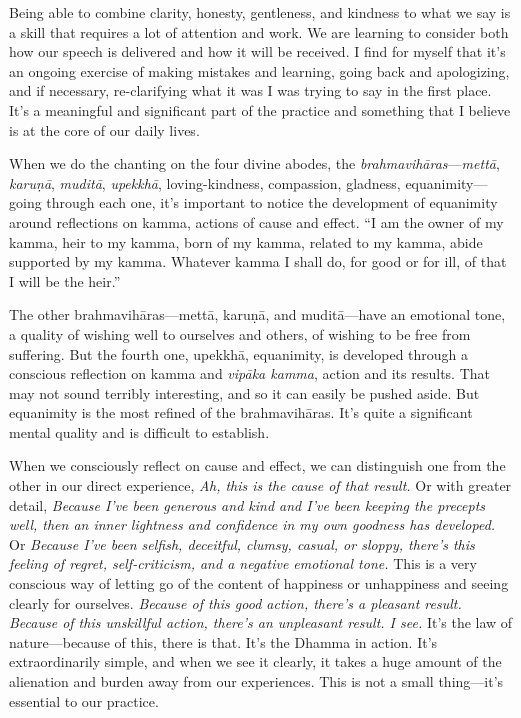 Being able to combine clarity, honesty, gentleness, and kindness to 
what we say is a skill that requires a lot of attention and work. We 
are learning to consider both how our speech is delivered and how it 
will be received. I find for myself that it's an ongoing exercise of 
making mistakes and learning, going back and apologizing, and if 
necessary, re-clarifying what it was I was trying to say in the first 
place. It's a meaningful and significant part of the practice and 
something that I believe is at the core of our daily lives.


When we do the chanting on the four divine abodes, the 
\emph{brahmavihāras}---\emph{mettā}, \emph{karuṇā}, 
\emph{muditā}, \emph{upekkhā}, loving-kindness, compassion, gladness, 
equanimity---going through each one, it's important to notice the 
development of equanimity around reflections on kamma, actions of cause 
and effect. ``I am the owner of my kamma, heir to my kamma, born of my 
kamma, related to my kamma, abide supported by my kamma. Whatever kamma 
I shall do, for good or for ill, of that I will be the heir.''

The other brahmavihāras---mettā, karuṇā, and muditā---have an 
emotional tone, a quality of wishing well to ourselves and others, of 
wishing to be free from suffering. But the fourth one, upekkhā, 
equanimity, is developed through a conscious reflection on kamma and 
\emph{vipāka kamma}, action and its results. That may not sound 
terribly interesting, and so it can easily be pushed aside. But 
equanimity is the most refined of the brahmavihāras. It's quite a 
significant mental quality and is difficult to establish.

When we consciously reflect on cause and effect, we can distinguish one 
from the other in our direct experience, \emph{Ah, this is the cause of 
that result.} Or with greater detail, \emph{Because I've been generous 
and kind and I've been keeping the precepts well, then an inner 
lightness and confidence in my own goodness has developed.} Or 
\emph{Because I've been selfish, deceitful, clumsy, casual, or sloppy, 
there's this feeling of regret, self-criticism, and a negative 
emotional tone.} This is a very conscious way of letting go of the 
content of happiness or unhappiness and seeing clearly for ourselves. 
\emph{Because of this good action, there's a pleasant result. Because 
of this unskillful action, there's an unpleasant result. I see.} It's 
the law of nature---because of this, there is that. It's the Dhamma in 
action. It's extraordinarily simple, and when we see it clearly, it 
takes a huge amount of the alienation and burden away from our 
experiences. This is not a small thing---it's essential to our practice.

